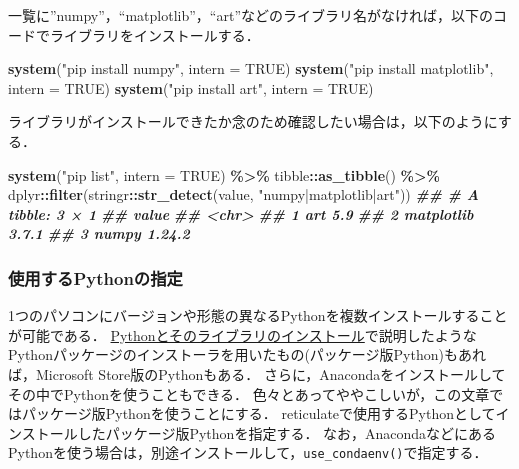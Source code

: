\documentclass[
]{article}
\newenvironment{Shaded}{\begin{snugshade}}{\end{snugshade}}
\newcommand{\AttributeTok}[1]{\textcolor[rgb]{0.13,0.29,0.53}{#1}}
\newcommand{\ConstantTok}[1]{\textcolor[rgb]{0.56,0.35,0.01}{#1}}
\newcommand{\DocumentationTok}[1]{\textcolor[rgb]{0.56,0.35,0.01}{\textbf{\textit{#1}}}}
\newcommand{\FunctionTok}[1]{\textcolor[rgb]{0.13,0.29,0.53}{\textbf{#1}}}
\newcommand{\NormalTok}[1]{#1}
\newcommand{\SpecialCharTok}[1]{\textcolor[rgb]{0.81,0.36,0.00}{\textbf{#1}}}
\newcommand{\StringTok}[1]{\textcolor[rgb]{0.31,0.60,0.02}{#1}}
\begin{document}
一覧に''numpy''，``matplotlib''，``art''などのライブラリ名がなければ，以下のコードでライブラリをインストールする．

\begin{Shaded}
\begin{Highlighting}[]
\FunctionTok{system}\NormalTok{(}\StringTok{"pip install numpy"}\NormalTok{, }\AttributeTok{intern =} \ConstantTok{TRUE}\NormalTok{)}
\FunctionTok{system}\NormalTok{(}\StringTok{"pip install matplotlib"}\NormalTok{, }\AttributeTok{intern =} \ConstantTok{TRUE}\NormalTok{)}
\FunctionTok{system}\NormalTok{(}\StringTok{"pip install art"}\NormalTok{, }\AttributeTok{intern =} \ConstantTok{TRUE}\NormalTok{)}
\end{Highlighting}
\end{Shaded}

ライブラリがインストールできたか念のため確認したい場合は，以下のようにする．

\begin{Shaded}
\begin{Highlighting}[]
\FunctionTok{system}\NormalTok{(}\StringTok{"pip list"}\NormalTok{, }\AttributeTok{intern =} \ConstantTok{TRUE}\NormalTok{) }\SpecialCharTok{\%\textgreater{}\%}
\NormalTok{  tibble}\SpecialCharTok{::}\FunctionTok{as\_tibble}\NormalTok{() }\SpecialCharTok{\%\textgreater{}\%}
\NormalTok{  dplyr}\SpecialCharTok{::}\FunctionTok{filter}\NormalTok{(stringr}\SpecialCharTok{::}\FunctionTok{str\_detect}\NormalTok{(value, }\StringTok{"numpy|matplotlib|art"}\NormalTok{))}
\DocumentationTok{\#\# \# A tibble: 3 × 1}
\DocumentationTok{\#\#   value                 }
\DocumentationTok{\#\#   \textless{}chr\textgreater{}                 }
\DocumentationTok{\#\# 1 art             5.9   }
\DocumentationTok{\#\# 2 matplotlib      3.7.1 }
\DocumentationTok{\#\# 3 numpy           1.24.2}
\end{Highlighting}
\end{Shaded}

\hypertarget{identify_python}{%
\subsubsection{使用するPythonの指定}\label{identify_python}}

1つのパソコンにバージョンや形態の異なるPythonを複数インストールすることが可能である．
\protect\hyperlink{install_python}{Pythonとそのライブラリのインストール}で説明したようなPythonパッケージのインストーラを用いたもの(パッケージ版Python)もあれば，Microsoft Store版のPythonもある．
さらに，Anacondaをインストールしてその中でPythonを使うこともできる．
色々とあってややこしいが，この文章ではパッケージ版Pythonを使うことにする．
reticulateで使用するPythonとしてインストールしたパッケージ版Pythonを指定する．
なお，AnacondaなどにあるPythonを使う場合は，別途インストールして，\texttt{use\_condaenv()}で指定する．
\end{document}
